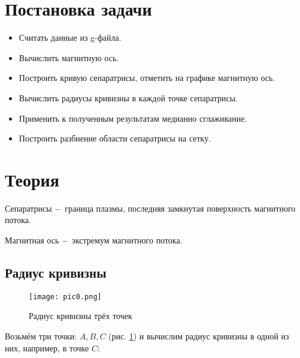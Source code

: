 \documentclass[a4]{article}
\renewcommand{\listoffigures}{\begingroup %
\tocsection
\tocfile{\listfigurename}{lof}
\endgroup}
\begin{document}
\newpage
\pagestyle{plain}



\newpage
\tableofcontents{}
\newpage
\listoffigures{}
\newpage

\section{Постановка задачи}
\begin{itemize}
    \item Считать данные из g-файла.

\item Вычислить магнитную ось.

\item Построить кривую сепаратрисы, отметить на графике магнитную ось.

\item Вычислить радиусы кривизны в каждой точке сепаратрисы.

\item Применить к полученным результатам медианно сглаживание.

\item Построить разбиение области сепаратрисы на сетку.
\end{itemize}


\section{Теория}
Сепаратрисы $\--$ граница плазмы, последняя замкнутая поверхность магнитного потока.

Магнитная ось $\--$ экстремум магнитного потока.
\subsection{Радиус кривизны}
\begin{figure}[H]
\begin{center}
\caption{Радиус кривизны трёх точек}
\label{fig:1}
\texttt{[image: pic0.png]} 
\end{center}
\end{figure}

Возьмём три точки: $A,B,C$ (рис. \ref{fig:1}) и вычислим радиус кривизны в одной из них, например, в точке $C$:
\end{document}
